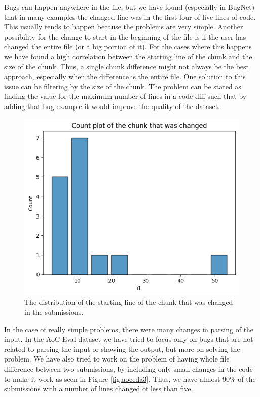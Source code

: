 \documentclass[12pt,a4paper]{report}
\begin{document}
Bugs can happen anywhere in the file, but we have found (especially in BugNet) that in many examples the changed line was in the first four of five lines of code. This usually tends to happen because the problems are very simple. Another possibility for the change to start in the beginning of the file is if the user has changed the entire file (or a big portion of it). For the cases where this happens we have found a high correlation between the starting line of the chunk and the size of the chunk. Thus, a single chunk difference might not always be the best approach, especially when the difference is the entire file. One solution to this issue can be filtering by the size of the chunk. The problem can be stated as finding the value for the maximum number of lines in a code diff such that by adding that bug example it would improve the quality of the dataset.

\begin{figure}[hp!]
\centering
\includegraphics[width=\textwidth]{pics/aoc_submissionchunk.png}
  \caption{The distribution of the starting line of the chunk that was changed in the submissions.}
  \label{fig:aoceda2}
\end{figure}

In the case of really simple problems, there were many changes in parsing of the input. In the AoC Eval dataset we have tried to focus only on bugs that are not related to parsing the input or showing the output, but more on solving the problem. We have also tried to work on the problem of having whole file difference between two submissions, by including only small changes in the code to make it work as seen in Figure \ref{fig:aoceda3}. Thus, we have almost 90\% of the submissions with a number of lines changed of less than five.
\end{document}
